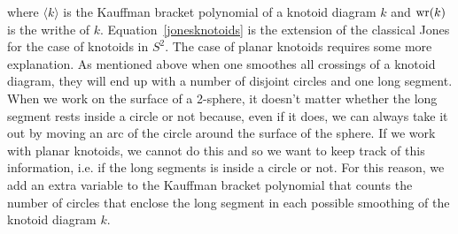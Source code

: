 where $\langle k \rangle$ is the Kauffman bracket polynomial of a knotoid diagram $k$ and ${\rm wr}(k)$ is the writhe of $k$. Equation~\ref{jonesknotoids} is the extension of the classical Jones for the case of knotoids in $S^2$. The case of planar knotoids requires some more explanation. As mentioned above when one smoothes all crossings of a knotoid diagram, they will end up with a number of disjoint circles and one long segment. When we work on the surface of a 2-sphere, it doesn't matter whether the long segment rests inside a circle or not because, even if it does, we can always take it out by moving an arc of the circle around the surface of the sphere. If we work with planar knotoids, we cannot do this and so we want to keep track of this information, i.e. if the long segments is inside a circle or not. For this reason, we add an extra variable to the Kauffman bracket polynomial that counts the number of circles that enclose the long segment in each possible smoothing of the knotoid diagram $k$.

